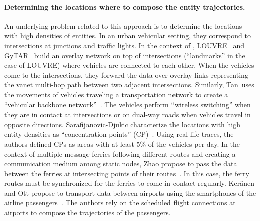 \paragraph{Determining the locations where to compose the entity trajectories.}
An underlying problem related to this approach is to determine the locations with high densities of entities. In an urban vehicular setting, they correspond to intersections at junctions and traffic lights. In the context of , LOUVRE~\cite{lee2008louvre} and GyTAR~\cite{jerbi2009towards} build an overlay network on top of intersections (``landmarks'' in the case of LOUVRE) where vehicles are connected to each other. When the vehicles come to the intersections, they forward the data over overlay links representing the \acrshort{vanet} multi-hop path between two adjacent intersections. Similarly, Tan~\etal uses the movements of vehicles traveling a transportation network to create a ``vehicular backbone network''~\cite{tan2014vehicular}. The vehicles perform ``wireless switching'' when they are in contact at intersections or on dual-way roads when vehicles travel in opposite directions. Sarafijanovic-Djukic \etal characterize the locations with high entity densities as ``concentration points'' (CP)~\cite{sarafijanovic2006island}. Using real-life traces, the authors defined CPs as areas with at least 5\% of the vehicles per day. In the context of multiple message ferries following different routes and creating a communication medium among static nodes, Zhao \etal propose to pass the data between the ferries at intersecting points of their routes~\cite{zhao2005controlling}. In this case, the ferry routes must be synchronized for the ferries to come in contact regularly. Ker{\"a}nen and Ott propose to transport data between airports using the smartphones of the airline passengers~\cite{keranen2009dtn}. The authors rely on the scheduled flight connections at airports to compose the trajectories of the passengers. 

